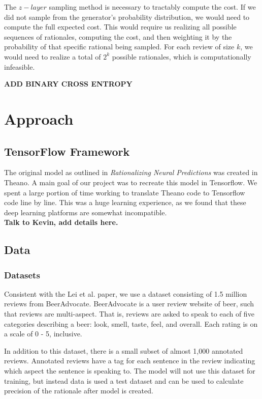 \documentclass{article} %
\begin{document}
The $z-layer$ sampling method is necessary to tractably compute the cost. If we
did not sample from the generator's probability distribution, we would need to
compute the full expected cost. This would require us realizing all possible
sequences of rationales, computing the cost, and then weighting it by the
probability of that specific rational being sampled. For each review of size
$k$, we would need to realize a total of $2^{k}$ possible rationales, which is
computationally infeasible.

\textbf{ADD BINARY CROSS ENTROPY}

\section{Approach}

\subsection{TensorFlow Framework}

The original model as outlined in \textit{Rationalizing Neural Predictions} was
created in Theano. A main goal of our project was to recreate this model in
Tensorflow. We spent a large portion of time working to translate Theano code to
Tensorflow code line by line. This was a huge learning experience, as we found
that these deep learning platforms are somewhat incompatible. \\

\textbf{Talk to Kevin, add details here.}

\subsection{Data}

\subsubsection{Datasets}

Consistent with the Lei et al. paper, we use a dataset consisting of 1.5 million
reviews from BeerAdvocate. BeerAdvocate is a user review website of beer, such
that reviews are multi-aspect. That is, reviews are asked to speak to each of
five categories describing a beer: look, smell, taste, feel, and overall. Each
rating is on a scale of 0 - 5, inclusive.

In addition to this dataset, there is a small subset of almost 1,000 annotated
reviews. Annotated reviews have a tag for each sentence in the review indicating
which aspect the sentence is speaking to. The model will not use this dataset
for training, but instead data is used a test dataset and can be used to
calculate precision of the rationale after model is created.
\end{document}
